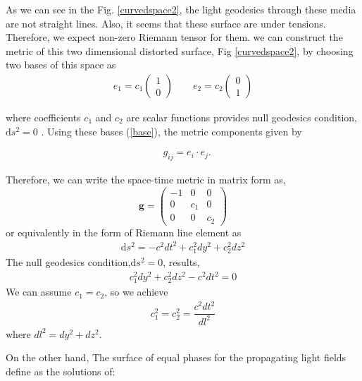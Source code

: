 \documentclass[9pt,twocolumn,twoside]{osajnl}
\begin{document}
As we can see in the Fig. \ref{curvedspace2}, the light geodesics through these media
 are not straight lines. Also, it seems that these surface are under tensions.  Therefore,  we expect non-zero Riemann tensor for them.  
we can construct the  metric of  this two dimensional distorted surface, Fig \ref{curvedspace2},  by choosing two bases of this space as 
\begin{eqnarray}\label{base}
e_{1}=c_{1}
\begin{pmatrix}
1\\0
\end{pmatrix} \qquad
e_{2}=c_{2}
\begin{pmatrix}
0\\1
\end{pmatrix}
\end{eqnarray}

 where coefficients $c_{1}$ and $c_{2}$  are scalar functions provides null geodesics condition, $\mathrm{d}s^{2}=0$ . Using these bases (\ref{base}), the metric components \cite{leonhardt2012geometry} given by
 
\begin{eqnarray}
&g_{ij}=e_{i}\cdot e_{j}.
\end{eqnarray}

Therefore, we can write the space-time metric in matrix form as,  
\begin{equation}
\mathbf{g}=
\begin{pmatrix}
-1&0&0\\
0&c_{1}&0\\
0&0&c_{2}
\end{pmatrix}
\end{equation}
or equivalently in the form of Riemann line element as
\begin{eqnarray}
\mathrm{d}s^{2}=-c^{2}dt^{2}+c_{1}^{2} dy^{2} +c_{2}^{2} dz^{2}
\end{eqnarray}
The null geodesics condition,$\mathrm{d}s^{2}=0$,  results,
\begin{eqnarray}
 c_{1}^{2} dy^{2} +c_{2}^{2} dz^{2}-c^{2}dt^{2}=0
\end{eqnarray}
We can assume $c_{1}=c_{2}$, so we achieve
\begin{eqnarray}\label{c1c2}
c_{1}^{2}=c_{2}^{2} =\dfrac{c^{2}dt^{2}}{dl^{2}}
\end{eqnarray}
where $dl^{2}=dy^{2}+dz^{2}$.

On the other hand, The surface of equal phases for the propagating light fields define as the solutions of:
\end{document}
